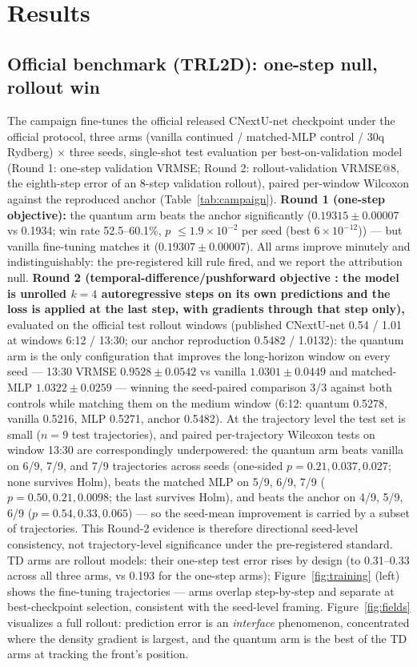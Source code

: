 \documentclass{article}
\newcommand{\TRLanchorRepro}{0.1934}  %
\newcommand{\TRLvanilla}{$0.19307 \pm 0.00007$}
\newcommand{\TRLquantum}{$0.19315 \pm 0.00007$}
\newcommand{\TRLpvalue}{$\le 1.9{\times}10^{-2}$ per seed (best $6{\times}10^{-12}$)}
\newcommand{\TRLwinrate}{52.5--60.1\%}
\newcommand{\TDvanilla}{$1.0301 \pm 0.0449$}
\newcommand{\TDquantum}{$\mathbf{0.9528 \pm 0.0542}$}
\newcommand{\TDmlp}{$1.0322 \pm 0.0259$}
\begin{document}
\section{Results}
\label{sec:results}

\subsection{Official benchmark (TRL2D): one-step null, rollout win}
\label{sec:campaign}

The campaign fine-tunes the official released CNextU-net checkpoint under
the official protocol, three arms (vanilla continued / matched-MLP control /
30q Rydberg) $\times$ three seeds, single-shot test evaluation per
best-on-validation model (Round 1: one-step validation VRMSE; Round 2:
rollout-validation VRMSE@8, the eighth-step error of an 8-step validation
rollout), paired per-window Wilcoxon against the reproduced anchor
(Table~\ref{tab:campaign}). \textbf{Round 1 (one-step objective):}
the quantum arm beats the anchor significantly (\TRLquantum{} vs
\TRLanchorRepro; win rate \TRLwinrate, $p$ \TRLpvalue) --- but vanilla
fine-tuning matches it (\TRLvanilla). All arms improve minutely and
indistinguishably: the pre-registered kill rule fired, and we report the
attribution null. \textbf{Round 2 (temporal-difference/pushforward
objective \citep{brandstetter2022message}: the model is unrolled $k{=}4$
autoregressive steps on its own predictions and the loss is applied at the
last step, with gradients through that step only),}
evaluated on the official test rollout windows (published CNextU-net
0.54 / 1.01 at windows 6:12 / 13:30; our anchor reproduction
0.5482 / 1.0132): the quantum arm is the only configuration that improves
the long-horizon window on every seed --- 13:30 VRMSE \TDquantum{} vs
vanilla \TDvanilla{} and matched-MLP \TDmlp{} --- winning the seed-paired
comparison 3/3 against both controls while matching them on the medium
window (6:12: quantum 0.5278, vanilla 0.5216, MLP 0.5271, anchor 0.5482).
At the trajectory level the test set is small ($n{=}9$ test
trajectories), and paired per-trajectory Wilcoxon tests on window 13:30
are correspondingly underpowered: the quantum arm beats vanilla on 6/9,
7/9, and 7/9 trajectories across seeds (one-sided $p = 0.21, 0.037,
0.027$; none survives Holm), beats the matched MLP on 5/9, 6/9, 7/9
($p = 0.50, 0.21, 0.0098$; the last survives Holm), and beats the anchor
on 4/9, 5/9, 6/9 ($p = 0.54, 0.33, 0.065$) --- so the seed-mean
improvement is carried by a subset of trajectories. This Round-2 evidence
is therefore directional seed-level consistency, not trajectory-level
significance under the pre-registered standard. TD arms are rollout models: their one-step test error rises by
design (to 0.31--0.33 across all three arms, vs 0.193 for the one-step
arms); Figure~\ref{fig:training} (left) shows the fine-tuning
trajectories ---
arms overlap step-by-step and separate at best-checkpoint selection,
consistent with the seed-level framing. Figure~\ref{fig:fields} visualizes
a full rollout: prediction error is an \emph{interface} phenomenon,
concentrated where the density gradient is largest, and the quantum arm is
the best of the TD arms at tracking the front's position.
\end{document}
